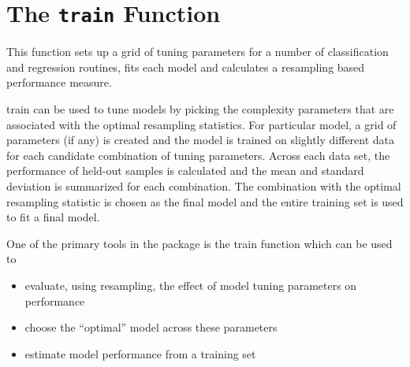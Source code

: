 \section{The \texttt{train} Function}
This function sets up a grid of tuning parameters for a number of classification and regression routines, fits each model and calculates a resampling based performance measure.


train can be used to tune models by picking the complexity parameters that are associated with the optimal resampling statistics. For particular model, a grid of parameters (if any) is created and the model is trained on slightly different data for each candidate combination of tuning parameters. Across each data set, the performance of held-out samples is calculated and the mean and standard deviation is summarized for each combination. The combination with the optimal resampling statistic is chosen as the final model and the entire training set is used to fit a final model.



One of the primary tools in the package is the train function which can be used to

\begin{itemize}
\item evaluate, using resampling, the eﬀect of model tuning parameters on performance
\item choose the “optimal” model across these parameters
\item estimate model performance from a training set
\end{itemize}


